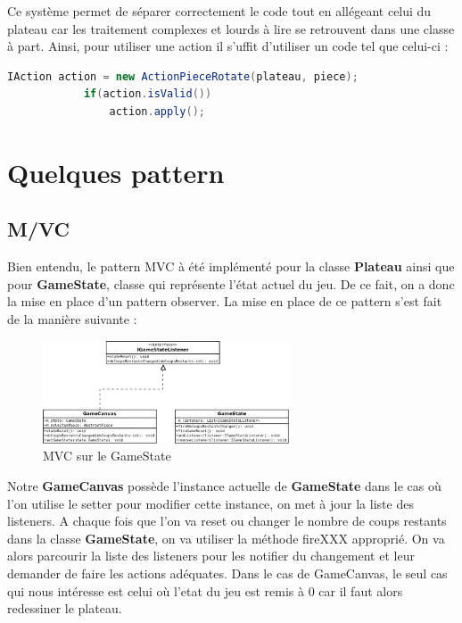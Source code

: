 \documentclass[report]{BetterDocument}
\begin{document}
		Ce système permet de séparer correctement le code tout en allégeant celui du plateau car les traitement complexes et lourds à lire se retrouvent dans une classe à part. Ainsi, pour utiliser une action il s'uffit d'utiliser un code tel que celui-ci :

		\begin{lstlisting}[gobble=12, language=Java, caption=Utilisation d'une Action]
			IAction action = new ActionPieceRotate(plateau, piece);
			if(action.isValid())
				action.apply();
		\end{lstlisting}

	\section{Quelques pattern}

		\subsection{M/VC}

			Bien entendu, le pattern MVC à été implémenté pour la classe \textbf{Plateau} ainsi que pour \textbf{GameState}, classe qui représente l'état actuel du jeu. De ce fait, on a donc la mise en place d'un pattern observer. La mise en place de ce pattern s'est fait de la manière suivante :

			\begin{figure}[H]
				\centering\includegraphics[width=0.65\textwidth, keepaspectratio]{img/mvc.png}
				\caption{MVC sur le GameState}
			\end{figure}

			Notre \textbf{GameCanvas} possède l'instance actuelle de \textbf{GameState} dans le cas où l'on utilise le setter pour modifier cette instance, on met à jour la liste des listeners. A chaque fois que l'on va reset ou changer le nombre de coups restants dans la classe \textbf{GameState}, on va utiliser la méthode fireXXX approprié. On va alors parcourir la liste des listeners pour les notifier du changement et leur demander de faire les actions adéquates. Dans le cas de GameCanvas, le seul cas qui nous intéresse est celui où l'etat du jeu est remis à 0 car il faut alors redessiner le plateau.
\end{document}

